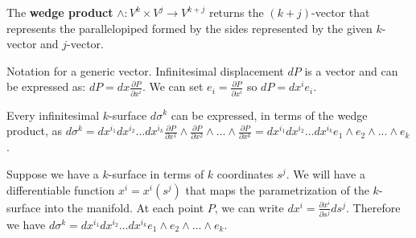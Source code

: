 \begin{defn}
	The \textbf{wedge product} $\wedge : V^k\times V^j \to V^{k+j}$ returns the $(k+j)$-vector that represents the parallelopiped formed by the sides represented by the given $k$-vector and $j$-vector. 
\end{defn}


\begin{remark}
	Notation for a generic vector. Infinitesimal displacement $dP$ is a vector and can be expressed as: $dP = dx \frac{\partial P}{\partial x^i}$. We can set $e_i = \frac{\partial P}{\partial x^i}$ so $dP = dx^i e_i$.
	
	Every infinitesimal $k$-surface $d\sigma^k$ can be expressed, in terms of the wedge product, as $d\sigma^k= dx^{i_1}dx^{i_2}...dx^{i_k}\frac{\partial P}{\partial x^1} \wedge \frac{\partial P}{\partial x^2} \wedge ... \wedge \frac{\partial P}{\partial x^k} = dx^{i_1}dx^{i_2}...dx^{i_k} e_1 \wedge e_2 \wedge ... \wedge e_k$.
	
	Suppose we have a $k$-surface in terms of $k$ coordinates $s^j$. We will have a differentiable function $x^i = x^i(s^j)$ that maps the parametrization of the $k$-surface into the manifold. At each point $P$, we can write $dx^i = \frac{\partial x^i}{\partial s^j} ds^j$. Therefore we have $d\sigma^k = dx^{i_1}dx^{i_2}...dx^{i_k} e_1 \wedge e_2 \wedge ... \wedge e_k$.
	

\end{remark}
